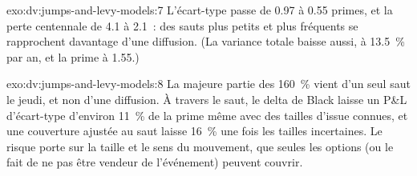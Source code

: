 \begin{solution}{exo:dv:jumps-and-levy-models:7}
L'écart-type passe de 0.97 à 0.55 primes, et la perte centennale de 4.1 à 2.1~: des sauts plus petits
et plus fréquents se rapprochent davantage d'une diffusion. (La variance totale baisse aussi, à 13.5~\% par an, et la prime
à 1.55.)
\end{solution}

\begin{solution}{exo:dv:jumps-and-levy-models:8}
La majeure partie des 160~\% vient d'un seul saut le jeudi, et non d'une diffusion. À travers le saut, le delta de Black laisse un P\&L
d'écart-type d'environ 11~\% de la prime même avec des tailles d'issue connues, et une couverture ajustée au saut laisse 16~\%
une fois les tailles incertaines. Le risque porte sur la taille et le sens du mouvement, que seules les options (ou le fait de ne pas
être vendeur de l'événement) peuvent couvrir.
\end{solution}

